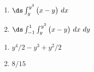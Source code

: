 {\begin{enumerate}
	\item $\ds \int_y^{y^2} \big(x-y\big)\ dx$\\
	\item $\ds \int_{-1}^1\int_y^{y^2} \big(x-y\big)\ dx\ dy$
\end{enumerate}
}
{\begin{enumerate}
	\item $y^4/2-y^3+y^2/2$
	\item	$8/15$
\end{enumerate}
}
